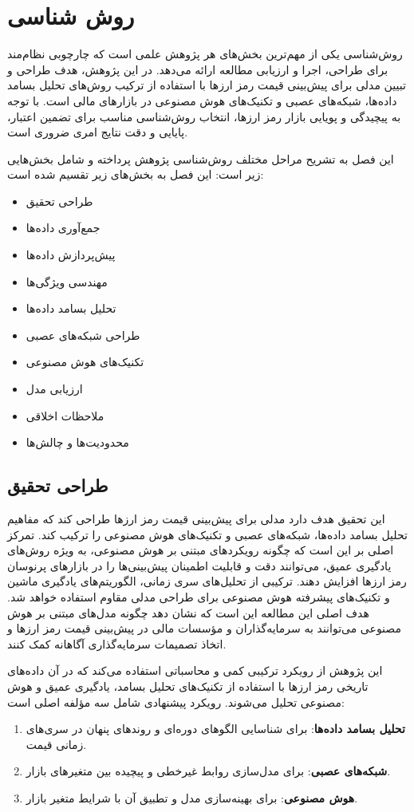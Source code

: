 \chapter{روش شناسی}


روش‌شناسی یکی از مهم‌ترین بخش‌های هر پژوهش علمی است که چارچوبی نظام‌مند برای طراحی، اجرا و ارزیابی مطالعه ارائه می‌دهد. در این پژوهش، هدف طراحی و تبیین مدلی برای پیش‌بینی قیمت رمز ارزها با استفاده از ترکیب روش‌های تحلیل بسامد داده‌ها، شبکه‌های عصبی و تکنیک‌های هوش مصنوعی در بازارهای مالی است. با توجه به پیچیدگی و پویایی بازار رمز ارزها، انتخاب روش‌شناسی مناسب برای تضمین اعتبار، پایایی و دقت نتایج امری ضروری است. 

این فصل به تشریح مراحل مختلف روش‌شناسی پژوهش پرداخته و شامل بخش‌هایی زیر است:
این فصل به بخش‌های زیر تقسیم شده است:
\begin{itemize}
	\item طراحی تحقیق
	\item جمع‌آوری داده‌ها
	\item پیش‌پردازش داده‌ها
	\item مهندسی ویژگی‌ها
	\item تحلیل بسامد داده‌ها
	\item طراحی شبکه‌های عصبی
	\item تکنیک‌های هوش مصنوعی
	\item ارزیابی مدل
	\item ملاحظات اخلاقی
	\item محدودیت‌ها و چالش‌ها
\end{itemize}




\section{طراحی تحقیق} 

این تحقیق هدف دارد مدلی برای پیش‌بینی قیمت رمز ارزها طراحی کند که مفاهیم تحلیل بسامد داده‌ها، شبکه‌های عصبی و تکنیک‌های هوش مصنوعی را ترکیب کند. تمرکز اصلی بر این است که چگونه رویکردهای مبتنی بر هوش مصنوعی، به ویژه روش‌های یادگیری عمیق، می‌توانند دقت و قابلیت اطمینان پیش‌بینی‌ها را در بازارهای پرنوسان رمز ارزها افزایش دهند. ترکیبی از تحلیل‌های سری زمانی، الگوریتم‌های یادگیری ماشین و تکنیک‌های پیشرفته هوش مصنوعی برای طراحی مدلی مقاوم استفاده خواهد شد. هدف اصلی این مطالعه این است که نشان دهد چگونه مدل‌های مبتنی بر هوش مصنوعی می‌توانند به سرمایه‌گذاران و مؤسسات مالی در پیش‌بینی قیمت رمز ارزها و اتخاذ تصمیمات سرمایه‌گذاری آگاهانه کمک کنند.

این پژوهش از رویکرد ترکیبی کمی و محاسباتی استفاده می‌کند که در آن داده‌های تاریخی رمز ارزها با استفاده از تکنیک‌های تحلیل بسامد، یادگیری عمیق و هوش مصنوعی تحلیل می‌شوند. رویکرد پیشنهادی شامل سه مؤلفه اصلی است:
\begin{enumerate}
	\item \textbf{تحلیل بسامد داده‌ها}: برای شناسایی الگوهای دوره‌ای و روندهای پنهان در سری‌های زمانی قیمت.
	\item \textbf{شبکه‌های عصبی}: برای مدل‌سازی روابط غیرخطی و پیچیده بین متغیرهای بازار.
	\item \textbf{هوش مصنوعی}: برای بهینه‌سازی مدل و تطبیق آن با شرایط متغیر بازار.
\end{enumerate}

